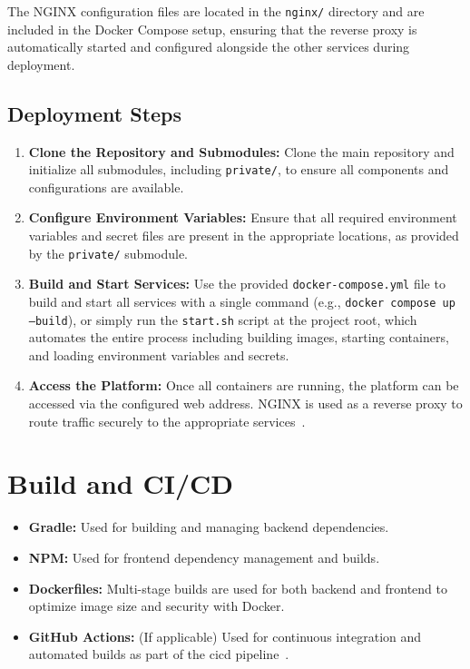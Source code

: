 The NGINX configuration files are located in the \texttt{nginx/} directory and are included in the Docker Compose setup, ensuring that the reverse proxy is automatically started and configured alongside the other services during deployment.

\subsection{Deployment Steps} \label{subsec:deployment_steps}

\begin{enumerate}
    \item \textbf{Clone the Repository and Submodules:} Clone the main repository and initialize all submodules, including \texttt{private/}, to ensure all components and configurations are available.
    \item \textbf{Configure Environment Variables:} Ensure that all required environment variables and secret files are present in the appropriate locations, as provided by the \texttt{private/} submodule.
    \item \textbf{Build and Start Services:} Use the provided \texttt{docker-compose.yml} file to build and start all services with a single command (e.g., \texttt{docker compose up --build}), or simply run the \texttt{start.sh} script at the project root, which automates the entire process including building images, starting containers, and loading environment variables and secrets.
    \item \textbf{Access the Platform:} Once all containers are running, the platform can be accessed via the configured web address. NGINX is used as a reverse proxy to route traffic securely to the appropriate services~\cite{nginx-docs}.
\end{enumerate}

\section{Build and CI/CD} \label{sec:build_cicd}

\begin{itemize}
    \item \textbf{Gradle:} Used for building and managing backend dependencies.
    \item \textbf{NPM:} Used for frontend dependency management and builds.
    \item \textbf{Dockerfiles:} Multi-stage builds are used for both backend and frontend to optimize image size and security with Docker.
    \item \textbf{GitHub Actions:} (If applicable) Used for continuous integration and automated builds as part of the \ac{cicd} pipeline~\cite{github-actions-docs}.
\end{itemize}

